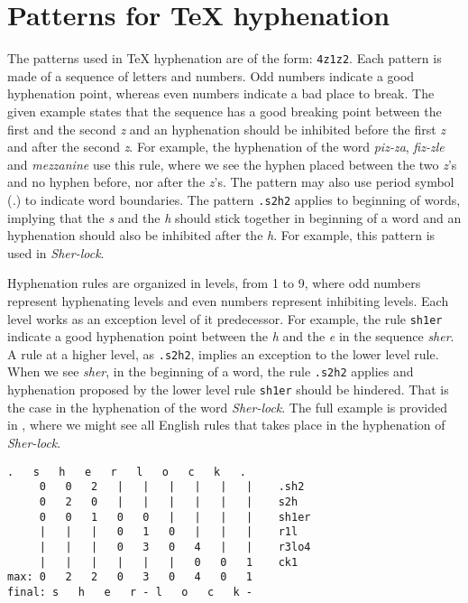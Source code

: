 \documentclass{article}
\begin{document}






\section{Patterns for \TeX{} hyphenation} 
The patterns used in \TeX{} hyphenation are of the form: \texttt{4z1z2}. Each
pattern is made of a sequence of letters and numbers. Odd numbers indicate a
good hyphenation point, whereas even numbers indicate a bad place to break.
The given example states that the sequence has a good breaking point between
the first and the second \emph{z} and an hyphenation should be inhibited before
the first \emph{z} and after the second \emph{z}. For example, the hyphenation
of the word \emph{piz-za}, \emph{fiz-zle} and \emph{mezzanine} use this rule,
where we see the hyphen placed between the two \emph{z}'s and no hyphen before,
nor after the \emph{z}'s. The pattern may also use period symbol (\emph{.}) to
indicate word boundaries. The pattern \texttt{.s2h2} applies to beginning of
words, implying that the \emph{s} and the \emph{h} should stick together in
beginning of a word and an hyphenation should also be inhibited after the
\emph{h}. For example, this pattern is used in \emph{Sher-lock}.

Hyphenation rules are organized in levels, from 1 to 9, where odd numbers
represent hyphenating levels and even numbers represent inhibiting levels. Each
level works as an exception level of it predecessor. For example, the rule
\texttt{sh1er} indicate a good hyphenation point between the \emph{h} and the
\emph{e} in the sequence \emph{sher}. A rule at a higher level, as
\texttt{.s2h2}, implies an exception to the lower level rule. When we see
\emph{sher}, in the beginning of a word, the rule \texttt{.s2h2} applies and
hyphenation proposed by the lower level rule \texttt{sh1er} should be hindered.
That is the case in the hyphenation of the word \emph{Sher-lock}. The full
example is provided in , where we might see all
English rules that takes place in the hyphenation of \emph{Sher-lock}.

\begin{lstlisting}[language={}, caption={Example of rules applyied in the
hyphenation of the word \emph{Sherlock}. Example done using a port of \TeX{}'s
hyphenation algorithm to Go provided at
\url{https://github.com/speedata/hyphenation}.}, label=sherlockhyphenation]
   .   s   h   e   r   l   o   c   k   .
     0   0   2   |   |   |   |   |   |    .sh2
     0   2   0   |   |   |   |   |   |    s2h
     0   0   1   0   0   |   |   |   |    sh1er
     |   |   |   0   1   0   |   |   |    r1l
     |   |   |   0   3   0   4   |   |    r3lo4
     |   |   |   |   |   |   0   0   1    ck1
max: 0   2   2   0   3   0   4   0   1
final: s   h   e   r - l   o   c   k -
\end{lstlisting}
\end{document}
